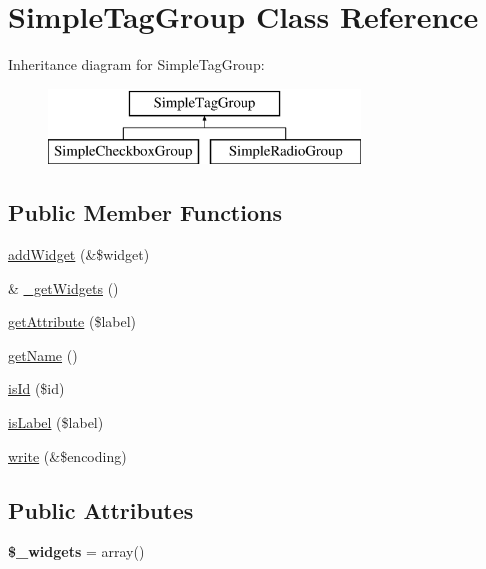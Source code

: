 \hypertarget{class_simple_tag_group}{
\section{SimpleTagGroup Class Reference}
\label{class_simple_tag_group}
}
Inheritance diagram for SimpleTagGroup:\begin{figure}[H]
\begin{center}
\leavevmode
\includegraphics[height=2.000000cm]{class_simple_tag_group}
\end{center}
\end{figure}
\subsection*{Public Member Functions}
\begin{DoxyCompactItemize}
\item 
\hyperlink{class_simple_tag_group_a37fc41944b1eeb66b1e0255a7fe7bcd8}{addWidget} (\&\$widget)
\item 
\& \hyperlink{class_simple_tag_group_a72480ffb09fe8bad5dac4eeacb02591b}{\_\-getWidgets} ()
\item 
\hyperlink{class_simple_tag_group_a79b75c7101783bb1d620cbc86df36d1e}{getAttribute} (\$label)
\item 
\hyperlink{class_simple_tag_group_a69dae8d1ffa832734b4f533d5cd9d9c9}{getName} ()
\item 
\hyperlink{class_simple_tag_group_a8595e023fdedb78e15773de25333b963}{isId} (\$id)
\item 
\hyperlink{class_simple_tag_group_ab89e430363d358093bdfe2fb1e2290f9}{isLabel} (\$label)
\item 
\hyperlink{class_simple_tag_group_a2fc52631817cbe0d5bd5f7dda5cf87ec}{write} (\&\$encoding)
\end{DoxyCompactItemize}
\subsection*{Public Attributes}
\begin{DoxyCompactItemize}
\item 
\hypertarget{class_simple_tag_group_aed7e1b800e8acd43d4852fe1f61b63e8}{
{\bfseries \$\_\-widgets} = array()}
\label{class_simple_tag_group_aed7e1b800e8acd43d4852fe1f61b63e8}

\end{DoxyCompactItemize}


